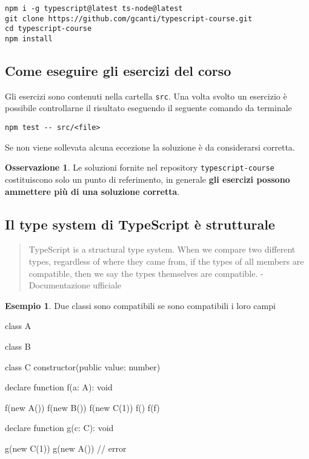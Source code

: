 \documentclass[12pt]{article}
\theoremstyle{definition}
\newtheorem{example}{Esempio}[subsection]
\newtheorem{observation}{Osservazione}[subsection]
\newenvironment{code}
  {\vspace{0.5cm} \VerbatimEnvironment\begin{typescriptcode}}
  {\end{typescriptcode} \vspace{0.2cm}}
\begin{document}
\begin{verbatim}
npm i -g typescript@latest ts-node@latest
git clone https://github.com/gcanti/typescript-course.git
cd typescript-course
npm install
\end{verbatim}

\subsection{Come eseguire gli esercizi del corso}

Gli esercizi sono contenuti nella cartella \texttt{src}. Una volta svolto un esercizio è possibile controllarne
il risultato eseguendo il seguente comando da terminale

\begin{verbatim}
npm test -- src/<file>
\end{verbatim}

Se non viene sollevata alcuna eccezione la soluzione è da considerarsi corretta.

\begin{observation}
Le soluzioni fornite nel repository \texttt{typescript-course} costituiscono solo un punto di referimento, in generale \textbf{gli esercizi possono ammettere più di una soluzione corretta}.
\end{observation}

\subsection{Il type system di TypeScript è strutturale}

\begin{quote}
TypeScript is a structural type system. When we compare two different types, regardless of where they came from,
if the types of all members are compatible, then we say the types themselves are compatible. - Documentazione ufficiale
\end{quote}

\begin{example}
Due classi sono compatibili se sono compatibili i loro campi

\begin{code}
class A {}

class B {}

class C {
  constructor(public value: number) {}
}

declare function f(a: A): void

f(new A())
f(new B())
f(new C(1))
f({})
f(f)

declare function g(c: C): void

g(new C(1))
g(new A()) // error
\end{code}
\end{example}
\end{document}
